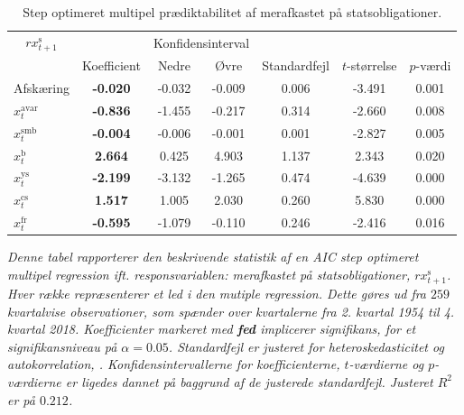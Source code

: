 \documentclass[
  a4paper,
  oneside]{memoir}
\begin{document}
\begin{table}[H]

\caption{\label{tab:MULT-step-s}Step optimeret multipel prædiktabilitet af merafkastet på statsobligationer.}
\centering
\begin{threeparttable}
\begin{tabular}[t]{lcccccc}
\toprule
\multicolumn{1}{c}{$rx_{t+1}^{\text{s}}$} & \multicolumn{1}{c}{ } & \multicolumn{2}{c}{Konfidensinterval} & \multicolumn{3}{c}{ } \\
\cmidrule(l{3pt}r{3pt}){1-1} \cmidrule(l{3pt}r{3pt}){3-4}
  & Koefficient & Nedre & Øvre & Standardfejl & $t$-størrelse & $p$-værdi\\
\midrule
\rowcolor{gray!6}  Afskæring & \textbf{-0.020} & -0.032 & -0.009 & 0.006 & -3.491 & 0.001\\
$x_t^{\text{avar}}$ & \textbf{-0.836} & -1.455 & -0.217 & 0.314 & -2.660 & 0.008\\
\rowcolor{gray!6}  $x_t^{\text{smb}}$ & \textbf{-0.004} & -0.006 & -0.001 & 0.001 & -2.827 & 0.005\\
$x_t^{\text{b}}$ & \textbf{ 2.664} & 0.425 & 4.903 & 1.137 & 2.343 & 0.020\\
\rowcolor{gray!6}  $x_t^{\text{ys}}$ & \textbf{-2.199} & -3.132 & -1.265 & 0.474 & -4.639 & 0.000\\
$x_t^{\text{cs}}$ & \textbf{ 1.517} & 1.005 & 2.030 & 0.260 & 5.830 & 0.000\\
\rowcolor{gray!6}  $x_t^{\text{fr}}$ & \textbf{-0.595} & -1.079 & -0.110 & 0.246 & -2.416 & 0.016\\
\bottomrule
\end{tabular}
\begin{tablenotes}
\item \textit{Denne tabel rapporterer den beskrivende statistik af en AIC step optimeret multipel regression ift. responsvariablen: merafkastet på statsobligationer, $rx_{t+1}^{\text{s}}$. Hver række repræsenterer et led i den mutiple regression. Dette gøres ud fra $259$ kvartalvise observationer, som spænder over kvartalerne fra 2. kvartal 1954 til 4. kvartal 2018. Koefficienter markeret med \textbf{fed} implicerer signifikans, for et signifikansniveau på $\alpha=0.05$. Standardfejl er justeret for heteroskedasticitet og autokorrelation, \citep{Newey1987}. Konfidensintervallerne for koefficienterne, $t$-værdierne og $p$-værdierne er ligedes dannet på baggrund af de justerede standardfejl. Justeret $R^2$ er på $0.212$.}
\end{tablenotes}
\end{threeparttable}
\end{table}
\end{document}
